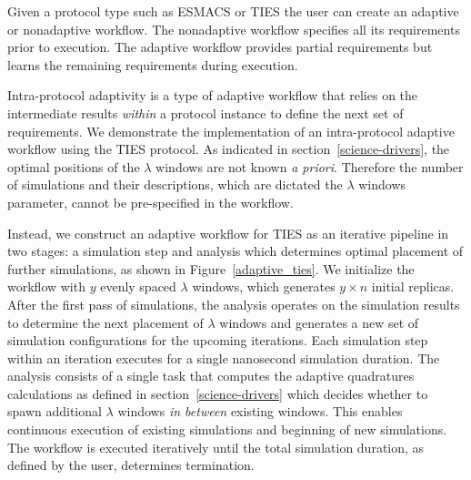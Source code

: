 
Given a protocol type such as ESMACS or TIES the user can create an adaptive or
nonadaptive workflow. The nonadaptive workflow specifies all its requirements 
prior to execution. The adaptive workflow provides partial requirements but 
learns the remaining requirements during execution. 

Intra-protocol adaptivity is a type of adaptive workflow that relies on the 
intermediate results \textit{within} a protocol instance to define the next set 
of requirements. We demonstrate the implementation of an intra-protocol adaptive 
workflow using the TIES protocol. As indicated in section~\ref{science-drivers}, 
the optimal positions of the $\lambda$ windows are not known \textit{a priori}. 
Therefore the number of simulations and their descriptions, which are 
dictated the $\lambda$ windows parameter, cannot be pre-specified in the 
workflow. 

Instead, we construct an adaptive workflow for TIES as an iterative pipeline in 
two stages: a simulation step and analysis which determines optimal 
placement of further simulations, as shown in Figure~\ref{adaptive_ties}. We 
initialize the workflow with $y$ evenly spaced $\lambda$ windows, which 
generates $y \times n$ initial replicas. After the first pass of simulations, 
the analysis operates on the simulation results to determine 
the next placement of $\lambda$ windows and generates a new set of simulation 
configurations for the upcoming iterations. Each simulation step within an 
iteration executes for a single nanosecond simulation duration. The analysis 
consists of a single task that computes the adaptive quadratures 
calculations as defined in section~\ref{science-drivers} which decides whether 
to spawn additional $\lambda$ windows \textit{in between} existing windows. This 
enables continuous execution of existing simulations and beginning of new 
simulations. The workflow is executed iteratively until the total simulation 
duration, as defined by the user, determines termination. 

